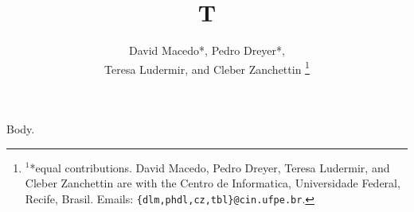 \documentclass[journal]{IEEEtran}
\begin{document}
\title{T}
\author{David Macedo*, Pedro Dreyer*,\\Teresa Ludermir, and Cleber Zanchettin
\thanks{$^{1}$*equal contributions. David Macedo, Pedro Dreyer, Teresa Ludermir, and Cleber Zanchettin are with the Centro de Informatica, Universidade Federal, Recife, Brasil. Emails: {\tt\small \{dlm,phdl,cz,tbl\}@cin.ufpe.br}.}}
\maketitle
Body.
\end{document}
